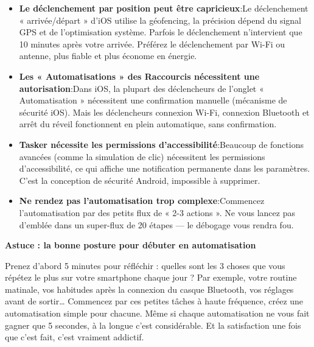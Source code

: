 \begin{itemize}
  \item \textbf{Le déclenchement par position peut être capricieux}:Le déclenchement « arrivée/départ » d’iOS utilise la géofencing, la précision dépend du signal GPS et de l’optimisation système. Parfois le déclenchement n’intervient que 10 minutes après votre arrivée. Préférez le déclenchement par Wi-Fi ou antenne, plus fiable et plus économe en énergie.
  \item \textbf{Les « Automatisations » des Raccourcis nécessitent une autorisation}:Dans iOS, la plupart des déclencheurs de l’onglet « Automatisation » nécessitent une confirmation manuelle (mécanisme de sécurité iOS). Mais les déclencheurs connexion Wi-Fi, connexion Bluetooth et arrêt du réveil fonctionnent en plein automatique, sans confirmation.
  \item \textbf{Tasker nécessite les permissions d’accessibilité}:Beaucoup de fonctions avancées (comme la simulation de clic) nécessitent les permissions d’accessibilité, ce qui affiche une notification permanente dans les paramètres. C’est la conception de sécurité Android, impossible à supprimer.
  \item \textbf{Ne rendez pas l’automatisation trop complexe}:Commencez l’automatisation par des petits flux de « 2-3 actions ». Ne vous lancez pas d’emblée dans un super-flux de 20 étapes — le débogage vous rendra fou.
\end{itemize}

\textbf{Astuce : la bonne posture pour débuter en automatisation}\par

Prenez d'abord 5 minutes pour réfléchir : quelles sont les 3 choses que vous répétez le plus sur votre smartphone chaque jour ? Par exemple, votre routine matinale, vos habitudes après la connexion du casque Bluetooth, vos réglages avant de sortir… Commencez par ces petites tâches à haute fréquence, créez une automatisation simple pour chacune. Même si chaque automatisation ne vous fait gagner que 5 secondes, à la longue c'est considérable. Et la satisfaction une fois que c'est fait, c'est vraiment addictif.

